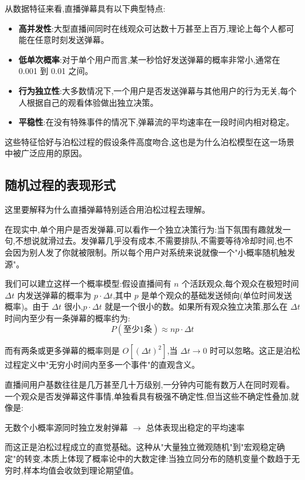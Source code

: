 \documentclass[12pt,a4paper]{article}
\begin{document}
从数据特征来看,直播弹幕具有以下典型特点:
\begin{itemize}
\item \textbf{高并发性}:大型直播间同时在线观众可达数十万甚至上百万,理论上每个人都可能在任意时刻发送弹幕。
\item \textbf{低单次概率}:对于单个用户而言,某一秒恰好发送弹幕的概率非常小,通常在 0.001 到 0.01 之间。
\item \textbf{行为独立性}:大多数情况下,一个用户是否发送弹幕与其他用户的行为无关,每个人根据自己的观看体验做出独立决策。
\item \textbf{平稳性}:在没有特殊事件的情况下,弹幕流的平均速率在一段时间内相对稳定。
\end{itemize}

这些特征恰好与泊松过程的假设条件高度吻合,这也是为什么泊松模型在这一场景中被广泛应用的原因。

\subsection{随机过程的表现形式}

这里要解释为什么直播弹幕特别适合用泊松过程去理解。

在现实中,单个用户是否发弹幕,可以看作一个独立决策行为:当下氛围有趣就发一句,不想说就滑过去。发弹幕几乎没有成本,不需要排队,不需要等待冷却时间,也不会因为别人发了你就被限制。所以每个用户对系统来说就像一个"小概率随机触发源"。

我们可以建立这样一个概率模型:假设直播间有 $n$ 个活跃观众,每个观众在极短时间 $\Delta t$ 内发送弹幕的概率为 $p \cdot \Delta t$,其中 $p$ 是单个观众的基础发送倾向(单位时间发送概率)。由于 $\Delta t$ 很小,$p \cdot \Delta t$ 就是一个很小的数。如果所有观众独立决策,那么在 $\Delta t$ 时间内至少有一条弹幕的概率约为:
\begin{equation}
P(\text{至少1条}) \approx np \cdot \Delta t
\end{equation}

而有两条或更多弹幕的概率则是 $O[(\Delta t)^2]$,当 $\Delta t \to 0$ 时可以忽略。这正是泊松过程定义中"无穷小时间内至多一个事件"的直观含义。

直播间用户基数往往是几万甚至几十万级别,一分钟内可能有数万人在同时观看。一个观众是否发弹幕这件事情,单独看具有极强不确定性,但当这些不确定性叠加,就像是:

\begin{center}
无数个小概率源同时独立发射弹幕 $\rightarrow$ 总体表现出稳定的平均速率
\end{center}

而这正是泊松过程成立的直觉基础。这种从"大量独立微观随机"到"宏观稳定确定"的转变,本质上体现了概率论中的大数定律:当独立同分布的随机变量个数趋于无穷时,样本均值会收敛到理论期望值。
\end{document}
